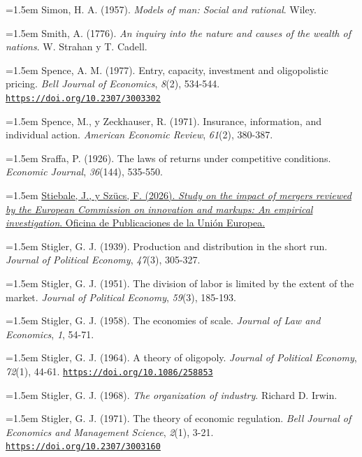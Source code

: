 \documentclass[10pt,a4paper]{article}
\begin{document}
\noindent\hangindent=1.5em Simon, H. A. (1957). \textit{Models of man: Social and rational}. Wiley.

\noindent\hangindent=1.5em Smith, A. (1776). \textit{An inquiry into the nature and causes of the wealth of nations}. W. Strahan y T. Cadell.

\noindent\hangindent=1.5em Spence, A. M. (1977). Entry, capacity, investment and oligopolistic pricing. \textit{Bell Journal of Economics}, \textit{8}(2), 534-544. \href{https://doi.org/10.2307/3003302}{\nolinkurl{https://doi.org/10.2307/3003302}}

\noindent\hangindent=1.5em Spence, M., y Zeckhauser, R. (1971). Insurance, information, and individual action. \textit{American Economic Review}, \textit{61}(2), 380-387.

\noindent\hangindent=1.5em Sraffa, P. (1926). The laws of returns under competitive conditions. \textit{Economic Journal}, \textit{36}(144), 535-550.

\noindent\hangindent=1.5em \href{https://competition-policy.ec.europa.eu/document/download/dc48d9d4-8151-454c-9bfc-c69af2c96e86_en?filename=kd0126016enn_Impact_mergers_innovation_and_markups.pdf}{Stiebale, J., y Szücs, F. (2026). \textit{Study on the impact of mergers reviewed by the European Commission on innovation and markups: An empirical investigation}. Oficina de Publicaciones de la Unión Europea.}

\noindent\hangindent=1.5em Stigler, G. J. (1939). Production and distribution in the short run. \textit{Journal of Political Economy}, \textit{47}(3), 305-327.

\noindent\hangindent=1.5em Stigler, G. J. (1951). The division of labor is limited by the extent of the market. \textit{Journal of Political Economy}, \textit{59}(3), 185-193.

\noindent\hangindent=1.5em Stigler, G. J. (1958). The economies of scale. \textit{Journal of Law and Economics}, \textit{1}, 54-71.

\noindent\hangindent=1.5em Stigler, G. J. (1964). A theory of oligopoly. \textit{Journal of Political Economy}, \textit{72}(1), 44-61. \href{https://doi.org/10.1086/258853}{\nolinkurl{https://doi.org/10.1086/258853}}

\noindent\hangindent=1.5em Stigler, G. J. (1968). \textit{The organization of industry}. Richard D. Irwin.

\noindent\hangindent=1.5em Stigler, G. J. (1971). The theory of economic regulation. \textit{Bell Journal of Economics and Management Science}, \textit{2}(1), 3-21. \href{https://doi.org/10.2307/3003160}{\nolinkurl{https://doi.org/10.2307/3003160}}
\end{document}
